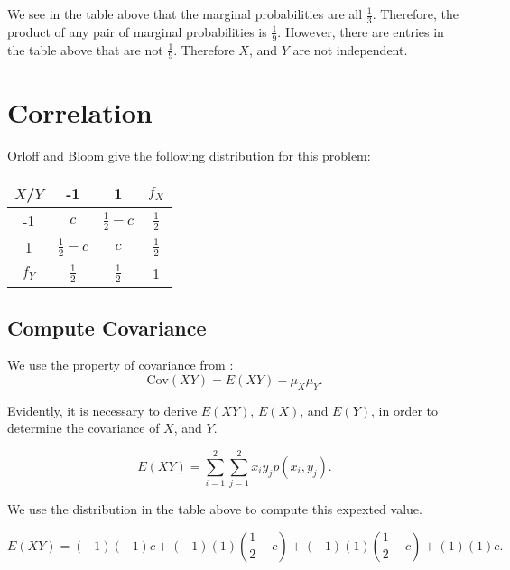 \documentclass[a5paper,11pt]{article}
\begin{document}
We see in the table above that the marginal probabilities are all $\frac{1}{3}$.
Therefore, the product of any pair of marginal probabilities is $\frac{1}{9}$.
However, there are entries in the table
above that are not $\frac{1}{9}$. Therefore
$X$, and $Y$ are not independent.

\section{Correlation}
Orloff and Bloom give the following
distribution for this problem:

\begin{center}
\begin{tabular}{ | c | c | c | c  |  }
    \hline
    $X$/$Y$ & -1 & 1 & $f_X$ \\ \hline
    -1 & $c$ & $\frac{1}{2} -c$ & $\frac{1}{2}$ \\ \hline
    1 & $\frac{1}{2} -c$ & $c$ & $\frac{1}{2}$ \\ \hline
    $f_Y$ & $\frac{1}{2}$ & $\frac{1}{2}$ & 1 \\ \hline
  \end{tabular}
\end{center}

\subsection{Compute Covariance}
We use the property of covariance from \cite{reading7b}:
\begin{equation}
\text{Cov}\left(XY\right) = E\left(XY \right)-\mu_X\mu_Y.
\end{equation}

Evidently, it is necessary to derive 
$E\left(XY \right)$, $E\left(X\right)$,
and $E\left(Y\right)$, in order to 
determine the covariance of $X$, and $Y$.

\begin{equation}
E\left(XY\right)=
\sum_{i=1}^2 \sum_{j=1}^2 x_i y_j 
p \left(x_i, y_j \right).
\end{equation}

We use the distribution in the table
above to compute this expexted value.

\begin{equation}
E\left(XY\right)=
\left(-1\right)\left(-1\right)c +
\left(-1\right)\left(1\right)\left(\frac{1}{2} -c\right) +
\left(-1\right)\left(1\right)\left(\frac{1}{2} -c\right) +
\left(1\right)\left(1\right)c.
\end{equation}
\end{document}
